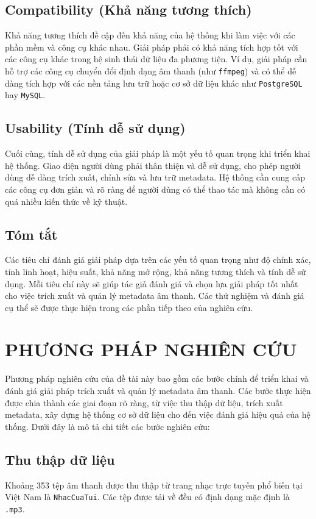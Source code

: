 \documentclass[conference]{IEEEtran}
\begin{document}
\subsection{Compatibility (Khả năng tương thích)}
Khả năng tương thích đề cập đến khả năng của hệ thống khi làm việc với các phần mềm và công cụ khác nhau. Giải pháp phải có khả năng tích hợp tốt với các công cụ khác trong hệ sinh thái dữ liệu đa phương tiện. Ví dụ, giải pháp cần hỗ trợ các công cụ chuyển đổi định dạng âm thanh (như \texttt{ffmpeg}) và có thể dễ dàng tích hợp với các nền tảng lưu trữ hoặc cơ sở dữ liệu khác như \texttt{PostgreSQL} hay \texttt{MySQL}.

\subsection{Usability (Tính dễ sử dụng)}
Cuối cùng, tính dễ sử dụng của giải pháp là một yếu tố quan trọng khi triển khai hệ thống. Giao diện người dùng phải thân thiện và dễ sử dụng, cho phép người dùng dễ dàng trích xuất, chỉnh sửa và lưu trữ metadata. Hệ thống cần cung cấp các công cụ đơn giản và rõ ràng để người dùng có thể thao tác mà không cần có quá nhiều kiến thức về kỹ thuật.

\subsection{Tóm tắt}
Các tiêu chí đánh giá giải pháp dựa trên các yếu tố quan trọng như độ chính xác, tính linh hoạt, hiệu suất, khả năng mở rộng, khả năng tương thích và tính dễ sử dụng. Mỗi tiêu chí này sẽ giúp tác giả đánh giá và chọn lựa giải pháp tốt nhất cho việc trích xuất và quản lý metadata âm thanh. Các thử nghiệm và đánh giá cụ thể sẽ được thực hiện trong các phần tiếp theo của nghiên cứu.



\section{PHƯƠNG PHÁP NGHIÊN CỨU}

Phương pháp nghiên cứu của đề tài này bao gồm các bước chính để triển khai và đánh giá giải pháp trích xuất và quản lý metadata âm thanh. Các bước thực hiện được chia thành các giai đoạn rõ ràng, từ việc thu thập dữ liệu, trích xuất metadata, xây dựng hệ thống cơ sở dữ liệu cho đến việc đánh giá hiệu quả của hệ thống. Dưới đây là mô tả chi tiết các bước nghiên cứu:

\subsection{Thu thập dữ liệu}
Khoảng 353 tệp âm thanh được thu thập từ trang nhạc trực tuyến phổ biến tại Việt Nam
 là \texttt{NhacCuaTui}. Các tệp được tải về đều có định dạng mặc định là \texttt{.mp3}.
\end{document}
